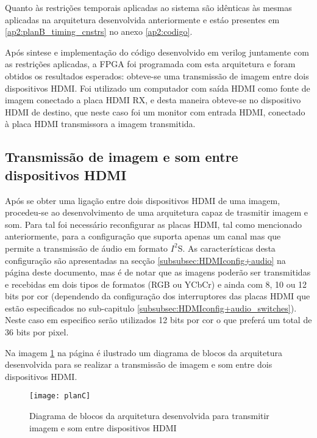 Quanto às restrições temporais aplicadas ao sistema são idênticas às mesmas aplicadas na arquitetura desenvolvida anteriormente e estáo presentes em \ref{ap2:planB_timing_cnstrs} no anexo \ref{ap2:codigo}.

Após sintese e implementação do código desenvolvido em verilog juntamente com as restrições aplicadas, a FPGA foi programada com esta arquitetura e foram obtidos os resultados esperados: obteve-se uma transmissão de imagem entre dois dispositivos HDMI. Foi utilizado um computador com saída HDMI como fonte de imagem conectado a placa HDMI RX, e desta maneira obteve-se no dispositivo HDMI de destino, que neste caso foi um monitor com entrada HDMI, conectado à placa HDMI transmissora a imagem transmitida.


\subsection{Transmissão de imagem e som entre dispositivos HDMI}

Após se obter uma ligação entre dois dispositivos HDMI de uma imagem, procedeu-se ao desenvolvimento de uma arquitetura capaz de trasmitir imagem e som. Para tal foi necessário reconfigurar as placas HDMI, tal como mencionado anteriormente, para a configuração que suporta apenas um canal mas que permite a transmissão de áudio em formato $I^{2}$S. As características desta configuração são apresentadas na secção \ref{subsubsec:HDMIconfig+audio} na página \pageref{subsubsec:HDMIconfig+audio} deste documento, mas é de notar que as imagens poderão ser transmitidas e recebidas em dois tipos de formatos (RGB ou YCbCr) e ainda com 8, 10 ou 12 bits por cor (dependendo da configuração dos interruptores das placas HDMI que estão especificados no sub-capitulo \ref{subsubsec:HDMIconfig+audio_switches}). Neste caso em especifico serão utilizados 12 bits por cor o que preferá um total de 36 bits por pixel.

Na imagem \ref{fig:planC} na página \pageref{fig:planC} é ilustrado um diagrama de blocos da arquitetura desenvolvida para se realizar a transmissão de imagem e som entre dois dispositivos HDMI. 

\begin{figure}[h!]
	\begin{center}
		\leavevmode
		\texttt{[image: planC]}
		\caption{Diagrama de blocos da arquitetura desenvolvida para transmitir imagem e som entre dispositivos HDMI}
		\label{fig:planC}
	\end{center}
\end{figure}

